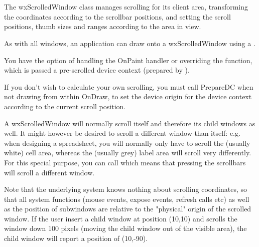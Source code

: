 \section{}\label{wxscrolledwindow}

The wxScrolledWindow class manages scrolling for its client area, transforming
the coordinates according to the scrollbar positions, and setting the
scroll positions, thumb sizes and ranges according to the area in view.

As with all windows, an application can draw onto a wxScrolledWindow using a .

You have the option of handling the OnPaint handler
or overriding the  function, which is passed
a pre-scrolled device context (prepared by ).

If you don't wish to calculate your own scrolling, you must call PrepareDC when not drawing from
within OnDraw, to set the device origin for the device context according to the current
scroll position.

A wxScrolledWindow will normally scroll itself and therefore its child windows as well. It
might however be desired to scroll a different window than itself: e.g. when designing a
spreadsheet, you will normally only have to scroll the (usually white) cell area, whereas the
(usually grey) label area will scroll very differently. For this special purpose, you can
call  which means that pressing
the scrollbars will scroll a different window.

Note that the underlying system knows nothing about scrolling coordinates, so that all system
functions (mouse events, expose events, refresh calls etc) as well as the position of subwindows
are relative to the "physical" origin of the scrolled window. If the user insert a child window at
position (10,10) and scrolls the window down 100 pixels (moving the child window out of the visible
area), the child window will report a position of (10,-90).



\\
\\
\\


